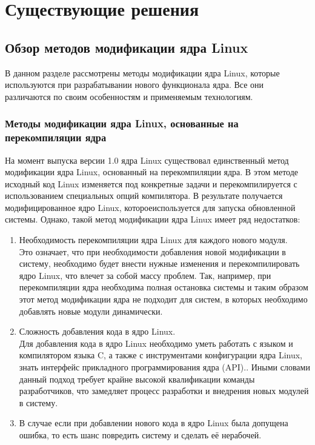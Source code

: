 \section{Существующие решения}\label{ch:--}
\subsection{Обзор методов модификации ядра Linux}\label{sec:----linux}

В данном разделе рассмотрены методы модификации ядра Linux,
которые используются при разрабатывании нового функционала ядра. 
Все они различаются по своим особенностям и применяемым технологиям.

\subsubsection{Методы модификации ядра Linux, основанные на перекомпиляции ядра}\label{subsec:---linux----}

На момент выпуска версии 1.0 ядра Linux существовал единственный метод модификации ядра Linux, основанный на перекомпиляции ядра.
В этом методе исходный код Linux изменяется под конкретные задачи и перекомпилируется с использованием специальных опций компилятора. 
В результате получается модифицированное ядро Linux, котороеиспользуется для запуска обновленной системы.
Однако, такой метод модификации ядра Linux имеет ряд недостатков:
\begin{enumerate}
    \item Необходимость перекомпиляции ядра Linux для каждого нового модуля. \vspace{1mm}\\
    Это означает, что при необходимости добавления новой модификации в систему, необходимо будет внести нужные изменения и перекомпилировать ядро Linux, что влечет за собой массу проблем. 
    Так, например, при перекомпиляции ядра необходима полная остановка системы и таким образом этот метод модификации ядра не подходит для систем, в которых необходимо добавлять новые модули динамически.
    \item Сложность добавления кода в ядро Linux. \vspace{1mm}\\
    Для добавления кода в ядро Linux необходимо уметь работать с языком и компилятором языка C, а также с инструментами конфигурации ядра Linux, знать интерфейс прикладного программирования ядра (API).\cite{API-linux}.
    Иными словами данный подход требует крайне высокой квалификации команды разработчиков, что замедляет процесс разработки и внедрения новых модулей в систему.
    \item В случае если при добавлении нового кода в ядро Linux была допущена ошибка, то есть шанс повредить систему и сделать её нерабочей.
\end{enumerate}

